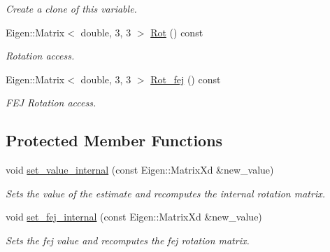 \begin{DoxyCompactItemize}
\begin{DoxyCompactList}\small\item\em Create a clone of this variable. \end{DoxyCompactList}\item 
\mbox{\label{classov__type_1_1JPLQuat_a8066e5417183815c51035932f3027f74}} 
Eigen\+::\+Matrix$<$ double, 3, 3 $>$ \hyperlink{classov__type_1_1JPLQuat_a8066e5417183815c51035932f3027f74}{Rot} () const
\begin{DoxyCompactList}\small\item\em Rotation access. \end{DoxyCompactList}\item 
\mbox{\label{classov__type_1_1JPLQuat_a2747deed39c33fe3cd2caeb7096dbc56}} 
Eigen\+::\+Matrix$<$ double, 3, 3 $>$ \hyperlink{classov__type_1_1JPLQuat_a2747deed39c33fe3cd2caeb7096dbc56}{Rot\+\_\+fej} () const
\begin{DoxyCompactList}\small\item\em F\+EJ Rotation access. \end{DoxyCompactList}\end{DoxyCompactItemize}
\subsection*{Protected Member Functions}
\begin{DoxyCompactItemize}
\item 
void \hyperlink{classov__type_1_1JPLQuat_a0ea10a064e10b3788ec541cf667c8e99}{set\+\_\+value\+\_\+internal} (const Eigen\+::\+Matrix\+Xd \&new\+\_\+value)
\begin{DoxyCompactList}\small\item\em Sets the value of the estimate and recomputes the internal rotation matrix. \end{DoxyCompactList}\item 
void \hyperlink{classov__type_1_1JPLQuat_ac1e67273e4414bc4a162787ff6d73a48}{set\+\_\+fej\+\_\+internal} (const Eigen\+::\+Matrix\+Xd \&new\+\_\+value)
\begin{DoxyCompactList}\small\item\em Sets the fej value and recomputes the fej rotation matrix. \end{DoxyCompactList}\end{DoxyCompactItemize}
